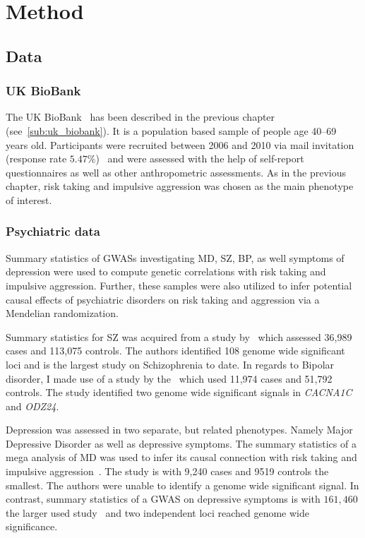 \section{Method}
\label{sec:method}

\subsection{Data}
\label{sub:data}

\subsubsection{UK BioBank}
\label{ssub:uk_biobank_psych}

The UK BioBank~\cite{Allen2014} has been described in the previous chapter (see~\ref{sub:uk_biobank}).
It is a population based sample of people age 40--69 years old. 
Participants were recruited between 2006 and 2010 via mail invitation (response rate $5.47\%$)~\cite{Sudlow2015} and were assessed with the help of self-report questionnaires as well as other anthropometric assessments.
As in the previous chapter, risk taking and impulsive aggression was chosen as the main phenotype of interest.

\subsubsection{Psychiatric data}
\label{ssub:psychiatric_data}

Summary statistics of GWASs investigating MD, SZ, BP, as well symptoms of depression were used to compute genetic correlations with risk taking and impulsive aggression.
Further, these samples were also utilized to infer potential causal effects of psychiatric disorders on risk taking and aggression via a Mendelian randomization.

Summary statistics for SZ was acquired from a study by~\citet{Ripke2014} which assessed 36,989 cases and 113,075 controls.
The authors identified 108 genome wide significant loci and is the largest study on Schizophrenia to date.
In regards to Bipolar disorder, I made use of a study by the~\citet{PsychiatricGWASConsortiumBipolarDisorderWorkingGroup2011} which used 11,974 cases and 51,792 controls.
The study identified two genome wide significant signals in \textit{CACNA1C} and \textit{ODZ24}.

Depression was assessed in two separate, but related phenotypes. 
Namely Major Depressive Disorder as well as depressive symptoms.
The summary statistics of a mega analysis of MD was used to infer its causal connection with risk taking and impulsive aggression~\cite{MajorDepressiveDisorderWorkingGroupofthePsychiatricGWASConsortium2013}.
The study is with 9,240 cases and 9519 controls the smallest. 
The authors were unable to identify a genome wide significant signal.
In contrast, summary statistics of a GWAS on depressive symptoms is with $161,460$ the larger used study~\cite{Okbay2016} and two independent loci reached genome wide significance.  

